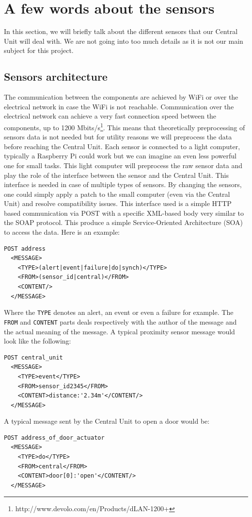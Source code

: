 \documentclass{acm_proc_article-sp}
\begin{document}
\section{A few words about the sensors}
In this section, we will briefly talk about the different sensors that our Central Unit will deal with. 
We are not going into too much details as it is not our main subject for this project.
\subsection{Sensors architecture}
The communication between the components are achieved by WiFi or over the electrical network in case the WiFi is not reachable. 
Communication over the electrical network can achieve a very fast connection speed between the components, up to 1200 Mbits/s\footnote{http://www.devolo.com/en/Products/dLAN-1200+}. 
This means that theoretically preprocessing of sensors data is not needed but for utility reasons we will preprocess the data before reaching the Central Unit.
Each sensor is connected to a light computer, typically a Raspberry Pi could work but we can imagine an even less powerful one for small tasks. 
This light computer will preprocess the raw sensor data and play the role of the interface between the sensor and the Central Unit. 
This interface is needed in case of multiple types of sensors. By changing the sensors, one could simply apply a patch to the small computer (even via the Central Unit) and resolve compatibility issues. 
This interface used is a simple HTTP based communication via POST with a specific XML-based body very similar to the SOAP protocol. 
This produce a simple Service-Oriented Architecture (SOA) to access the data. 
Here is an example:
\begin{verbatim}
POST address 
  <MESSAGE>
    <TYPE>(alert|event|failure|do|synch)</TYPE>
    <FROM>(sensor_id|central)</FROM>
    <CONTENT/>
  </MESSAGE>
\end{verbatim}
Where the \texttt{TYPE} denotes an alert, an event or even a failure for example. 
The \texttt{FROM} and \texttt{CONTENT} parts deals respectively with the author of the message and the actual meaning of the message. 
A typical proximity sensor message would look like the following:
\begin{verbatim}
POST central_unit 
  <MESSAGE>
    <TYPE>event</TYPE>
    <FROM>sensor_id2345</FROM>
    <CONTENT>distance:'2.34m'</CONTENT/>
  </MESSAGE>
\end{verbatim}
A typical message sent by the Central Unit to open a door would be:
\begin{verbatim}
POST address_of_door_actuator
  <MESSAGE>
    <TYPE>do</TYPE>
    <FROM>central</FROM>
    <CONTENT>door[0]:'open'</CONTENT/>
  </MESSAGE> 
\end{verbatim}
\end{document}
